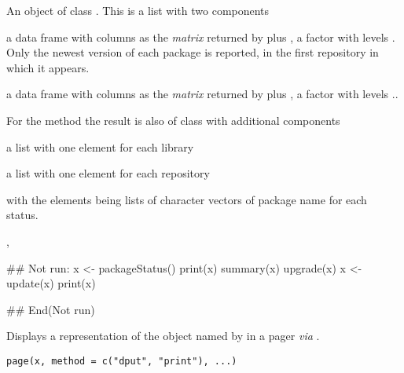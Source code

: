 %
\begin{Value}
An object of class .  This is a list with two
components

\begin{ldescription}
\item[\code{inst}] a data frame with columns as the \emph{matrix} returned by
 plus , a factor with
levels .  Only the newest version of each
package is reported, in the first repository in which it appears.


\item[\code{avail}] a data frame with columns as the \emph{matrix} returned by
 plus , a factor with
levels ..


\end{ldescription}
For the  method the result is also of class
 with additional components

\begin{ldescription}
\item[\code{Libs}] a list with one element for each library
\item[\code{Repos}] a list with one element for each repository

\end{ldescription}
with the elements being lists of character vectors of package name for
each status.
\end{Value}
%
\begin{SeeAlso}\relax
{}, 
\end{SeeAlso}
%
\begin{Examples}
\begin{ExampleCode}
## Not run: 
x <- packageStatus()
print(x)
summary(x)
upgrade(x)
x <- update(x)
print(x)

## End(Not run)
\end{ExampleCode}
\end{Examples}
%
\begin{Description}\relax
Displays a representation of the object named by  in a pager
\emph{via} .
\end{Description}
%
\begin{Usage}
\begin{verbatim}
page(x, method = c("dput", "print"), ...)
\end{verbatim}
\end{Usage}
